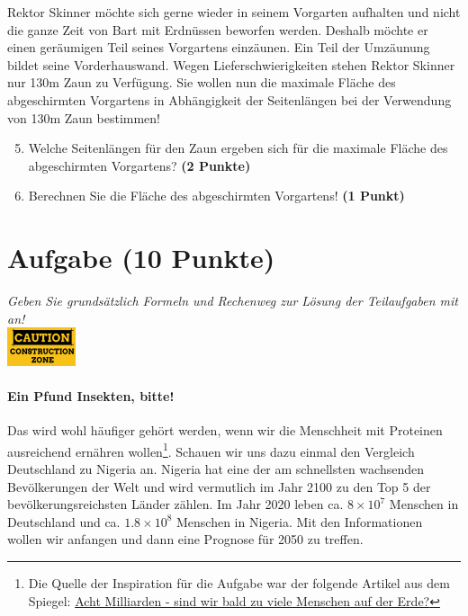 \documentclass[a4paper, 10pt]{scrartcl}\usepackage[]{graphicx}\usepackage[]{xcolor}
\begin{document}
Rektor Skinner m{\"o}chte sich gerne wieder in seinem Vorgarten aufhalten und
nicht die ganze Zeit von Bart mit Erdn{\"u}ssen beworfen werden. Deshalb m{\"o}chte
er einen ger{\"a}umigen Teil seines Vorgartens einz{\"a}unen. Ein Teil der
Umz{\"a}unung bildet seine Vorderhauswand. Wegen Lieferschwierigkeiten stehen
Rektor Skinner nur 130m Zaun zu Verf{\"u}gung. Sie wollen nun die
maximale Fl{\"a}che des abgeschirmten Vorgartens in Abh{\"a}ngigkeit der
Seitenl{\"a}ngen bei der Verwendung von 130m Zaun bestimmen!

\begin{enumerate}
  \setcounter{enumi}{4}  
\item  Welche Seitenl{\"a}ngen f{\"u}r den Zaun ergeben sich f{\"u}r die
  maximale Fl{\"a}che des abgeschirmten Vorgartens? \textbf{(2 Punkte)}
\item Berechnen Sie die Fl{\"a}che des abgeschirmten Vorgartens! \textbf{(1
    Punkt)}
\end{enumerate}

 
\clearpage

\section{Aufgabe \hfill (10 Punkte)}

\textit{Geben Sie grunds{\"a}tzlich Formeln und Rechenweg zur L{\"o}sung der
  Teilaufgaben mit an!} \\[1Ex]

\hfill\href{}{\includegraphics[width = 2cm]{img/caution}} %
\hspace{2Ex}




\paragraph{Ein Pfund Insekten, bitte!} Das wird wohl h{\"a}ufiger geh{\"o}rt 
werden, wenn wir die Menschheit mit Proteinen ausreichend ern{\"a}hren wollen\footnote{Die Quelle der Inspiration f{\"u}r die Aufgabe war der folgende
  Artikel aus dem Spiegel: \href{https://www.spiegel.de/ausland/ueberbevoelkerung-acht-milliarden-sind-wir-bald-zu-viele-menschen-auf-der-erde-a-3f20c7bc-3d60-4440-9f52-eb338db207f5}{Acht Milliarden - sind wir bald zu viele Menschen
  auf der Erde?}}. Schauen wir uns dazu einmal den Vergleich Deutschland zu
Nigeria an. Nigeria hat eine der am schnellsten wachsenden Bev{\"o}lkerungen der
Welt und wird vermutlich im Jahr 2100 zu den Top 5 der bev{\"o}lkerungsreichsten
L{\"a}nder z{\"a}hlen. Im Jahr 2020 leben ca. \ensuremath{8\times 10^{7}} Menschen in Deutschland und
ca. \ensuremath{1.8\times 10^{8}} Menschen in Nigeria. Mit den Informationen wollen wir
anfangen und dann eine Prognose f{\"u}r 2050 zu treffen. \\  
\end{document}
